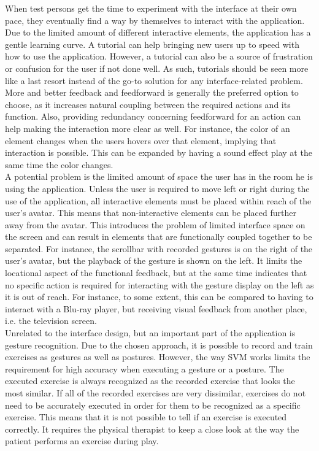 When test persons get the time to experiment with the interface at their own pace, they eventually find a way by themselves to interact with the application. Due to the limited amount of different interactive elements, the application has a gentle learning curve. A tutorial can help bringing new users up to speed with how to use the application. However, a tutorial can also be a source of frustration or confusion for the user if not done well. As such, tutorials should be seen more like a last resort instead of the go-to solution for any interface-related problem. More and better feedback and feedforward is generally the preferred option to choose, as it increases natural coupling between the required actions and its function. Also, providing redundancy concerning feedforward for an action can help making the interaction more clear as well. For instance, the color of an element changes when the users hovers over that element, implying that interaction is possible. This can be expanded by having a sound effect play at the same time the color changes.\\

A potential problem is the limited amount of space the user has in the room he is using the application. Unless the user is required to move left or right during the use of the application, all interactive elements must be placed within reach of the user's avatar. This means that non-interactive elements can be placed further away from the avatar. This introduces the problem of limited interface space on the screen and can result in elements that are functionally coupled together to be separated. For instance, the scrollbar with recorded gestures is on the right of the user's avatar, but the playback of the gesture is shown on the left. It limits the locational aspect of the functional feedback, but at the same time indicates that no specific action is required for interacting with the gesture display on the left as it is out of reach. For instance, to some extent, this can be compared to having to interact with a Blu-ray player, but receiving visual feedback from another place, i.e. the television screen.\\

Unrelated to the interface design, but an important part of the application is gesture recognition. Due to the chosen approach, it is possible to record and train exercises as gestures as well as postures. However, the way SVM works limits the requirement for high accuracy when executing a gesture or a posture. The executed exercise is always recognized as the recorded exercise that looks the most similar. If all of the recorded exercises are very dissimilar, exercises do not need to be accurately executed in order for them to be recognized as a specific exercise. This means that it is not possible to tell if an exercise is executed correctly. It requires the physical therapist to keep a close look at the way the patient performs an exercise during play.\\

